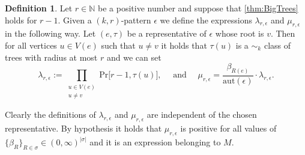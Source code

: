 \documentclass[12pt,notitlepage,a4paper]{article}
\theoremstyle{definition}
\newtheorem{definition}{Definition}[section]
\newcommand{\N}{\mathbb{N}}
\newcommand{\aut}{\mathrm{aut}}
\begin{document}
\begin{definition}
	Let $r\in \N$ be a positive number and
	suppose that \cref{thm:BigTrees} holds for $r-1$.
	Given a $(k,r)$-pattern $\epsilon$ we define the expressions
	$\lambda_{r,\epsilon}$ and $\mu_{r,\epsilon}$ in the following way.
	Let $(e,\tau)$ be a representative of $\epsilon$
	whose root is $v$. Then for all vertices $u\in V(e)$ such that
	$u\neq v$ it holds that $\tau(u)$ is a $\sim_k$ class of trees with
	radius at most $r$ and we can set  
	\[
	\lambda_{r,\epsilon}:=\prod_{\substack{u\in V(e)\\ u\neq v} } \mathrm{Pr}\big[
	r-1, \tau(u)\big], \quad \text{ and } \quad
	\mu_{r,\epsilon}=\frac{\beta_{R(e)}}{\aut(\epsilon)} 
	\cdot \lambda_{r,\epsilon}.
	\]
\end{definition}	
Clearly the definitions of $\lambda_{r,\epsilon}$ and
$\mu_{r,\epsilon}$ are independent of the chosen representative.
By hypothesis it holds
that $\mu_{r,\epsilon}$ is positive for all values of
$\{ \beta_R \}_{R\in \sigma}\in (0,\infty)^{|\sigma|}$
and it is an expression belonging to $M$.
\end{document}
